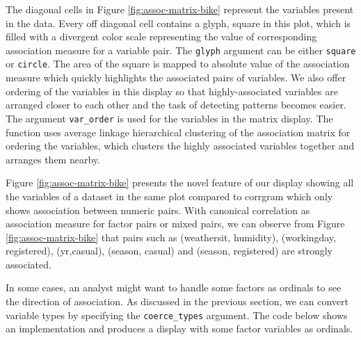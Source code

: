 The diagonal cells in Figure \ref{fig:assoc-matrix-bike} represent the
variables present in the data. Every off diagonal cell contains a glyph,
square in this plot, which is filled with a divergent color scale
representing the value of corresponding association measure for a
variable pair. The \texttt{glyph} argument can be either \texttt{square}
or \texttt{circle}. The area of the square is mapped to absolute value
of the association measure which quickly highlights the associated pairs
of variables. We also offer ordering of the variables in this display so
that highly-associated variables are arranged closer to each other and
the task of detecting patterns becomes easier. The argument
\texttt{var\_order} is used for the variables in the matrix display. The
function uses average linkage hierarchical clustering of the association
matrix for ordering the variables, which clusters the highly associated
variables together and arranges them nearby.

Figure \ref{fig:assoc-matrix-bike} presents the novel feature of our
display showing all the variables of a dataset in the same plot compared
to corrgram which only shows association between numeric pairs. With
canonical correlation as association measure for factor pairs or mixed
pairs, we can observe from Figure \ref{fig:assoc-matrix-bike} that pairs
such as (weathersit, humidity), (workingday, registered), (yr,casual),
(season, casual) and (season, registered) are strongly associated.

In some cases, an analyst might want to handle some factors as ordinals
to see the direction of association. As discussed in the previous
section, we can convert variable types by specifying the
\texttt{coerce\_types} argument. The code below shows an implementation
and produces a display with some factor variables as ordinals.

